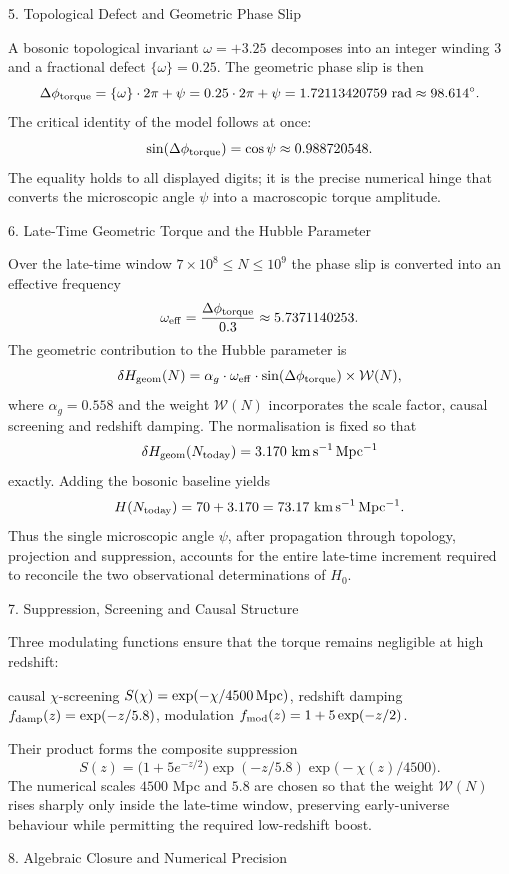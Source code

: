 5. Topological Defect and Geometric Phase Slip

A bosonic topological invariant \(\omega=+3.25\) decomposes into an integer winding \(3\) and a fractional defect \(\{\omega\}=0.25\). The geometric phase slip is then
\[
\Delta\phi_{\rm torque}=\{\omega\}\cdot 2\pi+\psi=0.25\cdot 2\pi+\psi=1.72113420759\ {\rm rad}\approx 98.614^\circ.
\]
The critical identity of the model follows at once:
\[
\sin(\Delta\phi_{\rm torque})=\cos\psi\approx 0.988720548.
\]
The equality holds to all displayed digits; it is the precise numerical hinge that converts the microscopic angle \(\psi\) into a macroscopic torque amplitude.

6. Late-Time Geometric Torque and the Hubble Parameter

Over the late-time window \(7\times 10^{8}\le N\le 10^{9}\) the phase slip is converted into an effective frequency
\[
\omega_{\rm eff}=\frac{\Delta\phi_{\rm torque}}{0.3}\approx 5.7371140253.
\]
The geometric contribution to the Hubble parameter is
\[
\delta H_{\rm geom}(N)=\alpha_{g}\cdot\omega_{\rm eff}\cdot\sin(\Delta\phi_{\rm torque})\times\mathcal{W}(N),
\]
where \(\alpha_{g}=0.558\) and the weight \(\mathcal{W}(N)\) incorporates the scale factor, causal screening and redshift damping. The normalisation is fixed so that
\[
\delta H_{\rm geom}(N_{\rm today})=3.170\ {\rm km\,s^{-1}\,Mpc^{-1}}
\]
exactly. Adding the bosonic baseline yields
\[
H(N_{\rm today})=70+3.170=73.17\ {\rm km\,s^{-1}\,Mpc^{-1}}.
\]
Thus the single microscopic angle \(\psi\), after propagation through topology, projection and suppression, accounts for the entire late-time increment required to reconcile the two observational determinations of \(H_{0}\).

7. Suppression, Screening and Causal Structure

Three modulating functions ensure that the torque remains negligible at high redshift:

causal \(\chi\)-screening \(S(\chi)=\exp(-\chi/4500\,{\rm Mpc})\),
redshift damping \(f_{\rm damp}(z)=\exp(-z/5.8)\),
modulation \(f_{\rm mod}(z)=1+5\exp(-z/2)\).

Their product forms the composite suppression
\[
S(z)=\bigl(1+5e^{-z/2}\bigr)\exp(-z/5.8)\exp\bigl(-\chi(z)/4500\bigr).
\]
The numerical scales \(4500\) Mpc and \(5.8\) are chosen so that the weight \(\mathcal{W}(N)\) rises sharply only inside the late-time window, preserving early-universe behaviour while permitting the required low-redshift boost.

8. Algebraic Closure and Numerical Precision

